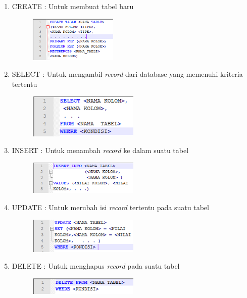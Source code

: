 	\begin{enumerate}
		\item 
		CREATE : Untuk membuat tabel baru
		\begin{figure}[H]
			\includegraphics[width=0.4\textwidth]{gambar/sql/create}
		\end{figure}
		\item
		SELECT : Untuk mengambil \textit{record} dari database yang memenuhi kriteria tertentu
		\begin{figure}[H]
			\includegraphics[width=0.5\textwidth]{gambar/sql/select}
		\end{figure} 
		\item
		INSERT : Untuk menambah \textit{record} ke dalam suatu tabel
		\begin{figure}[H]
			\includegraphics[width=0.5\textwidth]{gambar/sql/insert}
		\end{figure}
		\item
		UPDATE : Untuk merubah isi \textit{record} tertentu pada suatu tabel
		\begin{figure}[H]
			\includegraphics[width=0.5\textwidth]{gambar/sql/update}
		\end{figure}
		\item
		DELETE : Untuk menghapus \textit{record} pada suatu tabel
		\begin{figure}[H]
			\includegraphics[width=0.5\textwidth]{gambar/sql/delete}

\end{figure}
\end{enumerate}

